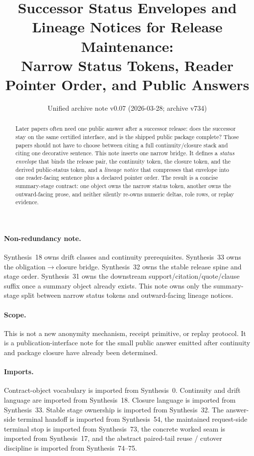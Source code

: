\documentclass[11pt]{article}
\title{Successor Status Envelopes and Lineage Notices for Release Maintenance:\\[0.5ex]
\large Narrow Status Tokens, Reader Pointer Order, and Public Answers}
\author{}
\date{Unified archive note v0.07 (2026-03-28; archive v734)}
\begin{document}
\maketitle

\begin{abstract}
Later papers often need one public answer after a successor release: does the successor stay on the same certified interface, and is the shipped public package complete?
Those papers should not have to choose between citing a full continuity/closure stack and citing one decorative sentence.
This note inserts one narrow bridge.
It defines a \emph{status envelope} that binds the release pair, the continuity token, the closure token, and the derived public-status token, and a \emph{lineage notice} that compresses that envelope into one reader-facing sentence plus a declared pointer order.
The result is a concise summary-stage contract: one object owns the narrow status token, another owns the outward-facing prose, and neither silently re-owns numeric deltas, role rows, or replay evidence.
\end{abstract}

\paragraph{Non-redundancy note.}
Synthesis~18 owns drift classes and continuity prerequisites.\cite{series:planstateequiv}
Synthesis~33 owns the obligation$\to$closure bridge.\cite{series:releaseclosure}
Synthesis~32 owns the stable release spine and stage order.\cite{series:releasespine}
Synthesis~31 owns the downstream support/citation/quote/clause suffix once a summary object already exists.\cite{series:downstreamnormalforms}
This note owns only the summary-stage split between narrow status tokens and outward-facing lineage notices.

\paragraph{Scope.}
This is not a new anonymity mechanism, receipt primitive, or replay protocol.
It is a publication-interface note for the small public answer emitted after continuity and package closure have already been determined.

\paragraph{Imports.}
Contract-object vocabulary is imported from Synthesis~0.\cite{series:contractobjects}
Continuity and drift language are imported from Synthesis~18.\cite{series:planstateequiv}
Closure language is imported from Synthesis~33.\cite{series:releaseclosure}
Stable stage ownership is imported from Synthesis~32.\cite{series:releasespine}
The answer-side terminal handoff is imported from Synthesis~54, the maintained request-side terminal stop is imported from Synthesis~73, the concrete worked seam is imported from Synthesis~17, and the abstract paired-tail reuse / cutover discipline is imported from Synthesis~74--75.\cite{series:challengeanswerreviewmenus,series:pairedterminalcitationdiscipline,series:pairedterminalcutoverrules,series:workedexample}
\end{document}

